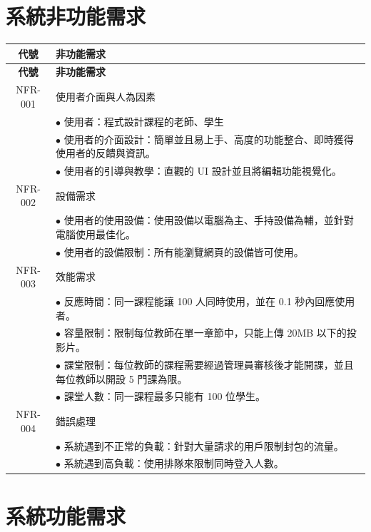 \documentclass[12pt]{article}
\begin{document}
\section{系統非功能需求}
\begin{longtable}{|c|p{15cm}|}
  \hline
  \textbf{代號} & \textbf{非功能需求} \\
  \hline
  \endfirsthead %
  \hline
  \textbf{代號} & \textbf{非功能需求} \\
  \hline
  \endhead %
  NFR-001 & 使用者介面與人為因素 \\ 
  & $\bullet$ 使用者：程式設計課程的老師、學生 \\
  & $\bullet$ 使用者的介面設計：簡單並且易上手、高度的功能整合、即時獲得使用者的反饋與資訊。 \\
  & $\bullet$ 使用者的引導與教學：直觀的 UI 設計並且將編輯功能視覺化。\\
  \hline
  NFR-002 & 設備需求 \\
  & $\bullet$ 使用者的使用設備：使用設備以電腦為主、手持設備為輔，並針對電腦使用最佳化。\\
  & $\bullet$ 使用者的設備限制：所有能瀏覽網頁的設備皆可使用。\\
  \hline
  NFR-003 & 效能需求 \\
  & $\bullet$ 反應時間：同一課程能讓 100 人同時使用，並在 0.1 秒內回應使用者。\\
  & $\bullet$ 容量限制：限制每位教師在單一章節中，只能上傳 20MB 以下的投影片。\\
  & $\bullet$ 課堂限制：每位教師的課程需要經過管理員審核後才能開課，並且每位教師以開設 5 門課為限。\\
  & $\bullet$ 課堂人數：同一課程最多只能有 100 位學生。\\
  \hline
  NFR-004 & 錯誤處理 \\
  & $\bullet$ 系統遇到不正常的負載：針對大量請求的用戶限制封包的流量。\\
  & $\bullet$ 系統遇到高負載：使用排隊來限制同時登入人數。\\
  \hline
\end{longtable}

\section{系統功能需求}
\end{document}
